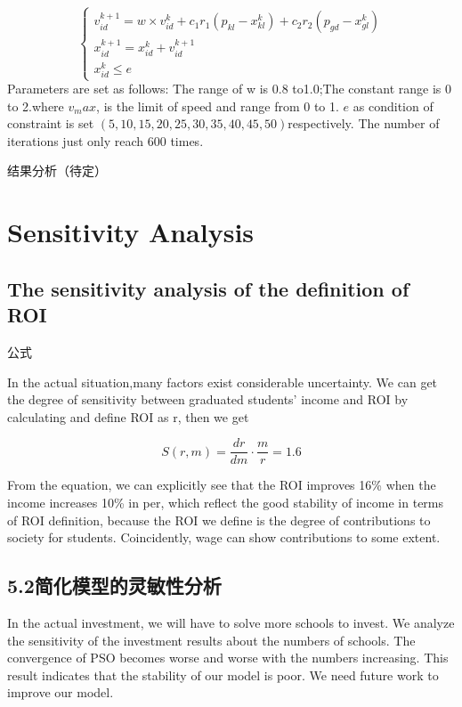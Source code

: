 $$\begin{cases}
v_{id}^{k+1}=w\times v_{id}^k+c_1r_1(p_{kl}-x_{kl}^k)+c_2r_2(p_{gd}-x_{gl}^k)\\
x_{id}^{k+1}=x_{id}^k+v_{id}^{k+1}\\
x_{id}^{k}\leqslant e
\end{cases}$$
Parameters are set as follows:
The range of w is 0.8 to1.0;The constant range is 0 to 2.where $v_max$, is the limit of speed and range from 0 to 1.
$e$ as condition of constraint is set $(5,10,15,20,25,30,35,40,45,50)$respectively. 
The number of iterations just only reach 600 times.


结果分析（待定）

\section{Sensitivity Analysis}
\subsection{The sensitivity analysis of the definition of ROI}

公式

In the actual situation,many factors exist considerable uncertainty. We can get the degree of sensitivity between graduated students’ income and ROI by calculating and define ROI as r, then we get  

$$S(r,m)=\frac{dr}{dm}\cdot\frac{m}{r}=1.6$$

From the equation, we can explicitly see that the ROI improves 16\% when the income increases 10\% in per, which reflect the good stability of income in terms of
ROI definition, because the ROI we define is the degree of contributions to society for students. Coincidently, wage can show contributions to some extent.
\par

\subsection{5.2简化模型的灵敏性分析}
In the actual investment, we will have to solve more schools to invest. We analyze the sensitivity of the investment results about the numbers of schools. The convergence of PSO becomes worse and worse with the numbers increasing. This result indicates that the stability of our model is poor. We need future work to improve our model.\par

